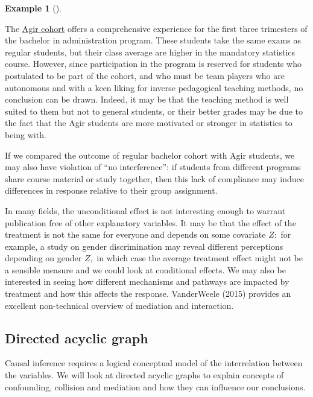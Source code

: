 \documentclass[
  11pt,
  letterpaper,
]{scrbook}
\theoremstyle{definition}
\theoremstyle{definition}
\newtheorem{example}{Example}[chapter]
\theoremstyle{remark}
\begin{document}
\begin{example}[]\protect\hypertarget{exm-nonrandomtreatment}{}\label{exm-nonrandomtreatment}

The
\href{https://www.hec.ca/programmes/baccalaureats/parcours-agir/index.html}{Agir
cohort} offers a comprehensive experience for the first three trimesters
of the bachelor in administration program. These students take the same
exams as regular students, but their class average are higher in the
mandatory statistics course. However, since participation in the program
is reserved for students who postulated to be part of the cohort, and
who must be team players who are autonomous and with a keen liking for
inverse pedagogical teaching methods, no conclusion can be drawn.
Indeed, it may be that the teaching method is well suited to them but
not to general students, or their better grades may be due to the fact
that the Agir students are more motivated or stronger in statistics to
being with.

If we compared the outcome of regular bachelor cohort with Agir
students, we may also have violation of ``no interference'': if students
from different programs share course material or study together, then
this lack of compliance may induce differences in response relative to
their group assignment.

\end{example}

In many fields, the unconditional effect is not interesting enough to
warrant publication free of other explanatory variables. It may be that
the effect of the treatment is not the same for everyone and depends on
some covariate \(Z:\) for example, a study on gender discrimination may
reveal different perceptions depending on gender \(Z,\) in which case
the average treatment effect might not be a sensible measure and we
could look at conditional effects. We may also be interested in seeing
how different mechanisms and pathways are impacted by treatment and how
this affects the response. VanderWeele (2015) provides an excellent
non-technical overview of mediation and interaction.

\subsection{Directed acyclic graph}\label{directed-acyclic-graph}

Causal inference requires a logical conceptual model of the
interrelation between the variables. We will look at directed acyclic
graphs to explain concepts of confounding, collision and mediation and
how they can influence our conclusions.
\end{document}
